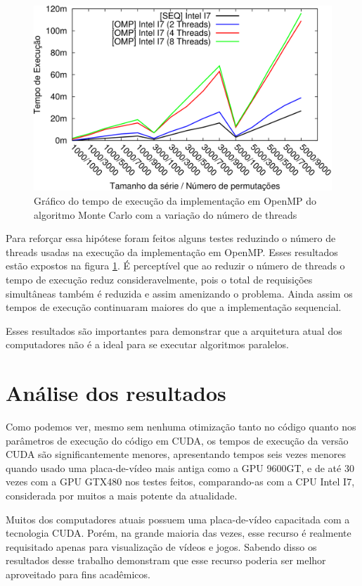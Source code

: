 \begin{figure}[H]
\centering
\includegraphics[]{Imagens/graficos_mcarlo/mcarlo_omp-threads.png}
\caption{Gráfico do tempo de execução da implementação em OpenMP do algoritmo Monte Carlo com a variação do número de threads}
\label{fig:grafico_mcarlo_omp_threads}
\end{figure}

Para reforçar essa hipótese foram feitos alguns testes reduzindo o número de threads usadas na execução da implementação em OpenMP. Esses resultados estão expostos na figura \ref{fig:grafico_mcarlo_omp_threads}. É perceptível que ao reduzir o número de threads o tempo de execução reduz consideravelmente, pois o total de requisições simultâneas também é reduzida e assim amenizando o problema. Ainda assim os tempos  de execução continuaram maiores do que a implementação sequencial.

Esses resultados são importantes para demonstrar que a arquitetura atual dos computadores não é a ideal para se executar algoritmos paralelos.

\section{Análise dos resultados}

Como podemos ver, mesmo sem nenhuma otimização tanto no código quanto nos parâmetros de execução do código em CUDA, os tempos de execução da versão CUDA são significantemente menores, apresentando tempos seis vezes menores quando usado uma placa-de-vídeo mais antiga como a GPU 9600GT, e de até 30 vezes com a GPU GTX480 nos testes feitos, comparando-as com a CPU Intel I7, considerada por muitos a mais potente da atualidade.

Muitos dos computadores atuais possuem uma placa-de-vídeo capacitada com a tecnologia CUDA. Porém, na grande maioria das vezes, esse recurso é realmente requisitado apenas para visualização de vídeos e jogos. Sabendo disso os resultados desse trabalho demonstram que esse recurso poderia ser melhor aproveitado para fins acadêmicos.